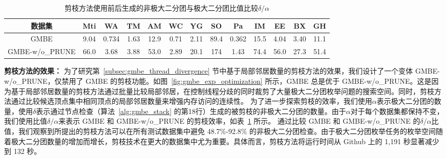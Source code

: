 \begin{table}[t]
  \setlength{\belowcaptionskip}{-0.2cm}
	\centering
	\caption{ 剪枝方法使用前后生成的非极大二分团与极大二分团比值比较$\delta/\alpha$}
	\label{tbl:gmbe_prune}
	\begin{center}
    \setlength{\tabcolsep}{2pt}
		\normalsize
    {
			\begin{tabular}{|c|c|c|c|c|c|c|c|c|c|c|c|c|}
				\hline
        \textbf{数据集} &Mti &WA &TM &AM &WC &YG &SO &Pa &IM &EE &BX &GH \\ \hline
        GMBE &9.04 &0.734 &1.63 &12.9 &0.71 &2.11 &89.4 &0.362 &15.5 &4.04 &3.40 &11.1 \\ 
        GMBE-w/o\_PRUNE &66.0 &3.68 &3.88 &53.0 &2.89 &20.1 &174 &1.43 &74.4 &56.0 &27.3 &51.4 \\ \hline
        

      \end{tabular}
		}
	\end{center}
  \vspace{-0.1in}
\end{table}

\textbf{剪枝方法的效果：} 为了研究第~\ref{subsec:gmbe_thread_divergence} 节中基于局部邻居数量的剪枝方法的效果，我们设计了一个变体 GMBE-w/o\_PRUNE，仅禁用了 GMBE 的剪枝功能。如图~\ref{fig:gmbe_exp_optimization} 所示，GMBE 总是优于 GMBE-w/o\_PRUNE。这是因为基于局部邻居数量的剪枝方法通过批量比较局部邻居，在控制线程分歧的同时裁剪了大量极大二分团枚举问题的搜索空间。同时，剪枝方法通过比较候选顶点集中相同顶点的局部邻居数量来增强内存访问的连续性。
为了进一步探索剪枝的效率，我们使用$\alpha$表示极大二分团的数量，使用$\delta$表示通过节点检查（算法~\ref{alg:gmbe_stack} 的第18行）生成的被剪枝的非极大二分团的数量。由于$\alpha$对于每个数据集都保持不变，我们使用比值$\delta/\alpha$来表示 GMBE 和 GMBE-w/o\_PRUNE 的剪枝效率，如表~\ref{tbl:gmbe_prune} 所示。
通过比较 GMBE 和 GMBE-w/o\_PRUNE 的$\delta/\alpha$比值，我们观察到所提出的剪枝方法可以在所有测试数据集中避免 48.7\%-92.8\% 的非极大二分团检查。由于极大二分团枚举任务的枚举空间随着极大二分团数量的增加而增长，剪枝技术在更大的数据集中尤为重要。具体而言，剪枝方法将运行时间从 Github 上的 1,191 秒显著减少到 132 秒。


